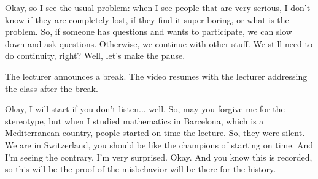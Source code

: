 \begin{spoken-clean}[00:24:04 - 00:25:30]
Okay, so I see the usual problem: when I see people that are very serious, I don't know if they are completely lost, if they find it super boring, or what is the problem. So, if someone has questions and wants to participate, we can slow down and ask questions. Otherwise, we continue with other stuff. We still need to do continuity, right? Well, let's make the pause. 
\end{spoken-clean}

\begin{lecture-break}
The lecturer announces a break. The video resumes with the lecturer addressing the class after the break.
\end{lecture-break}

\begin{spoken-clean}[00:25:30 - 00:26:39]
Okay, I will start if you don't listen... well. So, may you forgive me for the stereotype, but when I studied mathematics in Barcelona, which is a Mediterranean country, people started on time the lecture. So, they were silent. We are in Switzerland, you should be like the champions of starting on time. And I'm seeing the contrary. I'm very surprised. Okay. And you know this is recorded, so this will be the proof of the misbehavior will be there for the history.
\end{spoken-clean}

